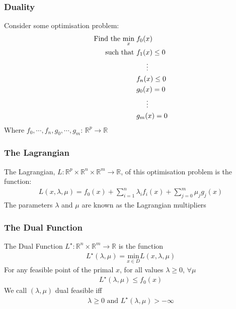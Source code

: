 \documentclass{beamer}
\def\rnum{\mathbb{R}}
\begin{document}
\begin{frame}
    \frametitle{Duality}
    Consider some optimisation problem:
    {\footnotesize
    \begin{align*}
        \text{Find the }\underset{x}{\text{min}}\; &f_{0}(x) \\
        \text{  such that }&f_{1}(x) \leq 0 \\
        & \hspace{5mm} \vdots \\
        &f_{n}(x) \leq 0 \\
        &g_{0}(x) = 0 \\
        &\hspace{5mm} \vdots \\
        &g_{m}(x) = 0
    \end{align*}}
    Where $f_0,\cdots, f_n, g_0, \cdots, g_m:\, \rnum^{p} \rightarrow \rnum$
\end{frame}

\begin{frame}
    \frametitle{The Lagrangian}
    The Lagrangian, $L : \rnum^{p} \times \rnum^{n} \times \rnum^{m} \rightarrow
    \rnum$, of this optimisation problem is the function:
    \begin{align*}
        L(x, \lambda, \mu) = f_{0}(x) + \sum\limits_{i=1}^{n}\lambda_{i} f_{i}(x) +
        \sum\limits_{j=0}^{m}\mu_{j}g_{j}(x)
    \end{align*}
    The parameters $\lambda$ and $\mu$ are known as the Lagrangian multipliers
\end{frame}

\begin{frame}
    \frametitle{The Dual Function}
    The Dual Function $L^{\star}: \rnum^{n}\times\rnum^{m} \rightarrow \rnum$ is
    the function
    \begin{align*}
        L^{\star}(\lambda, \mu) = \underset{x \in D}{\text{min}}L(x, \lambda, \mu)
    \end{align*}
    For any feasible point of the primal $x$, for all values
    $\lambda \geq 0$, $\forall \mu$
    \begin{align*}
        L^{\star}(\lambda, \mu) \leq f_{0}(x)
    \end{align*}
    We call $(\lambda, \mu)$ dual feasible iff
    \begin{align*}
        \lambda \geq 0 \text{ and } L^{\star}(\lambda, \mu) > -\infty
    \end{align*}
\end{frame}
\end{document}
